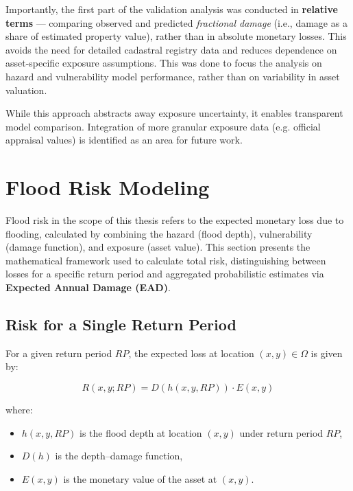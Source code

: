 Importantly, the first part of the validation analysis was conducted in \textbf{relative terms} — comparing observed and predicted \textit{fractional damage} (i.e., damage as a share of estimated property value), rather than in absolute monetary losses. This avoids the need for detailed cadastral registry data and reduces dependence on asset-specific exposure assumptions. This was done to focus the analysis on hazard and vulnerability model performance, rather than on variability in asset valuation.

While this approach abstracts away exposure uncertainty, it enables transparent model comparison. Integration of more granular exposure data (e.g. official appraisal values) is identified as an area for future work.


\section{Flood Risk Modeling}

Flood risk in the scope of this thesis refers to the expected monetary loss due to flooding, calculated by combining the hazard (flood depth), vulnerability (damage function), and exposure (asset value). This section presents the mathematical framework used to calculate total risk, distinguishing between losses for a specific return period and aggregated probabilistic estimates via \textbf{Expected Annual Damage (EAD)}.

\subsection{Risk for a Single Return Period}

For a given return period \( RP \), the expected loss at location \( (x, y) \in \Omega \) is given by:

\begin{equation}
	R(x, y; RP) = D(h(x, y, RP)) \cdot E(x, y)
	\label{eq:local-risk}
\end{equation}

where:
\begin{itemize}
	\item \( h(x, y, RP) \) is the flood depth at location \( (x, y) \) under return period \( RP \),
	\item \( D(h) \) is the depth--damage function,
	\item \( E(x, y) \) is the monetary value of the asset at \( (x, y) \).
\end{itemize}

